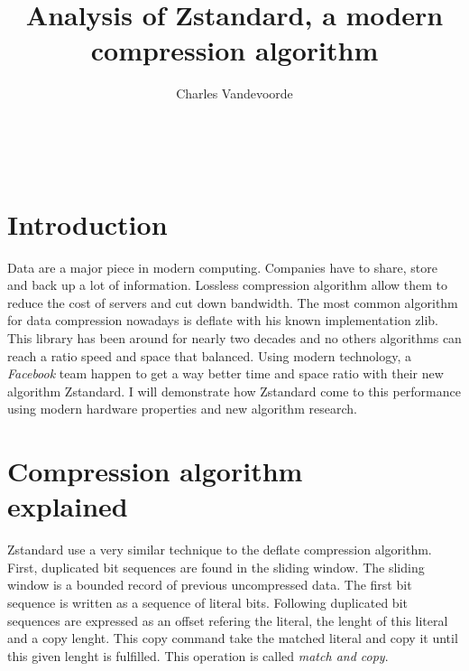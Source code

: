 \documentclass{sig-alternate-05-2015}
\begin{document}
\toappear

\title{Analysis of Zstandard, a modern compression algorithm}

\author{
\alignauthor
Charles Vandevoorde\\
       \\
       \\
       \\
}

\maketitle
\begin{abstract}

\end{abstract}


\section{Introduction}
    Data are a major piece in modern computing. Companies have to share, store and back up a
    lot of information. Lossless compression algorithm allow them to reduce the cost of servers and
    cut down bandwidth. The most common algorithm for data compression nowadays is deflate with his
    known implementation zlib.  This library has been around for nearly two decades and no others
    algorithms can reach a ratio speed and space that balanced. Using modern technology, a
    \textit{Facebook} team happen to get a way better time and space ratio with their new algorithm
    Zstandard. I will demonstrate how Zstandard come to this performance using modern hardware
    properties and new algorithm research.

\section{Compression algorithm \\ explained}
    Zstandard use a very similar technique to the deflate compression algorithm. First, duplicated
    bit sequences are found in the sliding window. The sliding window is a bounded record of
    previous uncompressed data.  The first bit sequence is written as a sequence of literal bits.
    Following duplicated bit sequences are expressed as an offset refering the literal, the
    lenght of this literal and a copy lenght. This copy command take the matched
    literal and copy it until this given lenght is fulfilled. This operation is called \textit{match
    and copy}.
\end{document}
